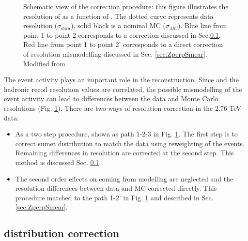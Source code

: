 \begin{figure}[!tbp]
\begin{center}

\begin{minipage}[h]{0.7\linewidth}
\end{minipage}

\end{center}
\caption{Schematic view of the correction procedure: this figure illustrates the resolution of \uperp as a function of \sumet. The dotted curve represents data resolution ($\sigma_{data}$), solid black is a nominal MC ($\sigma_{MC}$). Blue line from point 1 to point 2 corresponds to a \sumet correction discussed in Sec.\ref{sec:SumetCor}. Red line from point 1 to point 2' corresponds to a direct correction of resolution mismodelling discussed in Sec. \ref{sec:ZperpSmear}. Modified from \cite{HRCorrections}}

\label{ris:sumetCor}
\end{figure}


The event activity plays an important role in the \etmiss reconstruction. Since \sumet and the hadronic recoil resolution values are correlated, the possible mismodelling of the event activity can lead to differences between the data and Monte Carlo \etmiss resolutions (Fig. \ref{ris:sumetCor}). There are two ways of resolution correction in the 2.76 TeV data:
\begin{itemize}
\item As a two step procedure, shown as path 1-2-3 in Fig. \ref{ris:sumetCor}. The first step is to correct sumet distribution to match the data using reweighting of the events. Remaining differences in resolution are corrected at the second step. This method is discussed Sec. \ref{sec:SumetCor}. 
\item The second order effects on \etmiss coming from \sumet modelling are neglected and the resolution differences between data and MC corrected directly. This procedure matched to the path 1-2' in Fig. \ref{ris:sumetCor} and described in Sec. \ref{sec:ZperpSmear}.
\end{itemize}


\subsection{\sumet distribution correction}\label{sec:SumetCor}



